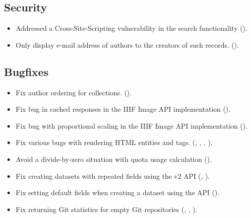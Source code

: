 \subsection*{Security}

\begin{itemize}
\item{Addressed a Cross-Site-Scripting vulnerability in the search functionality
    ().}
\item{Only display e-mail address of authors to the creators of such records.
    ().}
\end{itemize}

\subsection*{Bugfixes}
\begin{itemize}
\item{Fix author ordering for collections.
    ().}
\item{Fix bug in cached responses in the IIIF Image API implementation
    ().}
\item{Fix bug with proportional scaling in the IIIF Image API implementation
    ().}
\item{Fix various bugs with rendering HTML entities and tags.
    (,
    ,
    ,
    ).}
\item{Avoid a divide-by-zero situation with quota usage calculation
    ().}
\item{Fix creating datasets with repeated fields using the v2 API
    (,
    ).}
\item{Fix setting default fields when creating a dataset using the API
    ().}
\item{Fix returning Git statistics for empty Git repositories
    (,
    ,
    ).}
\end{itemize}

